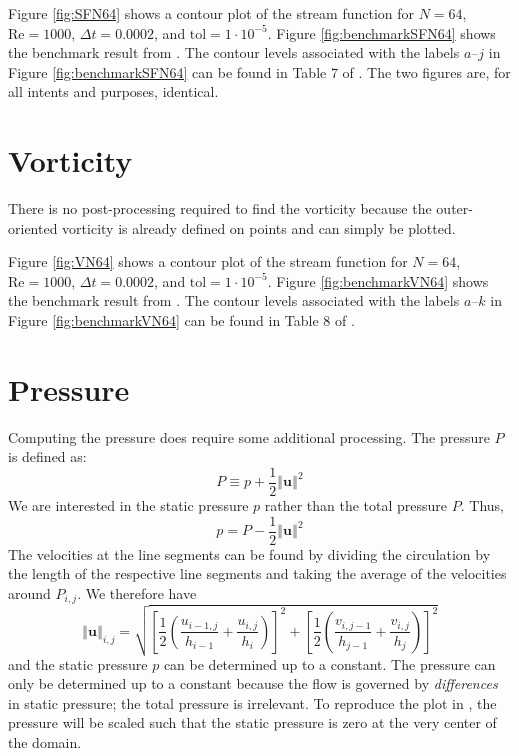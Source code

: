 Figure \ref{fig:SFN64} shows a contour plot of the stream function for $N = 64$, $\text{Re} = 1000$, $\Delta t = 0.0002$, and $\text{tol} = 1 \cdot 10^{-5}$. Figure \ref{fig:benchmarkSFN64} shows the benchmark result from \parencite{botella1998benchmark}. The contour levels associated with the labels $a$--$j$ in Figure \ref{fig:benchmarkSFN64} can be found in Table 7 of \parencite{botella1998benchmark}. The two figures are, for all intents and purposes, identical. 

\section{Vorticity}

There is no post-processing required to find the vorticity because the outer-oriented vorticity is already defined on points and can simply be plotted.

Figure \ref{fig:VN64} shows a contour plot of the stream function for $N = 64$, $\text{Re} = 1000$, $\Delta t = 0.0002$, and $\text{tol} = 1 \cdot 10^{-5}$. Figure \ref{fig:benchmarkVN64} shows the benchmark result from \parencite{botella1998benchmark}. The contour levels associated with the labels $a$--$k$ in Figure \ref{fig:benchmarkVN64} can be found in Table 8 of \parencite{botella1998benchmark}.

\section{Pressure}

Computing the pressure does require some additional processing. The pressure $P$ is defined as:
\begin{equation}
    P \equiv p + \frac{1}{2} \left\Vert \mathbf{u} \right\Vert^2
\end{equation}
We are interested in the static pressure $p$ rather than the total pressure $P$. Thus, 
\begin{equation}
    p = P - \frac{1}{2} \left\Vert \mathbf{u} \right\Vert^2
\end{equation}
The velocities at the line segments can be found by dividing the circulation by the length of the respective line segments and taking the average of the velocities around $P_{i,j}$. We therefore have
\begin{equation}
    \left\Vert \mathbf{u} \right\Vert_{i,j} = \sqrt{\left[ \frac{1}{2} \left( \frac{u_{i-1,j}}{h_{i-1}} + \frac{u_{i,j}}{h_i} \right) \right]^2 + \left[ \frac{1}{2} \left( \frac{v_{i,j-1}}{h_{j-1}} + \frac{v_{i,j}}{h_j} \right) \right]^2}
\end{equation}
and the static pressure $p$ can be determined up to a constant. The pressure can only be determined up to a constant because the flow is governed by \emph{differences} in static pressure; the total pressure is irrelevant. To reproduce the plot in \parencite{botella1998benchmark}, the pressure will be scaled such that the static pressure is zero at the very center of the domain.

